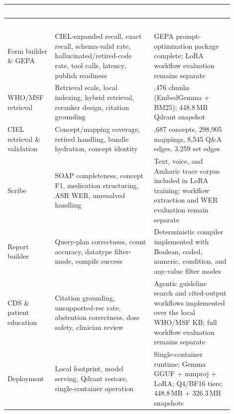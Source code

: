 \documentclass[11pt]{article}
\begin{document}
\vspace{0.4em}
{\footnotesize
\setlength{\LTleft}{0pt plus 1fill}\setlength{\LTright}{0pt plus 1fill}
\setlength{\LTpre}{0pt}\setlength{\LTpost}{0pt}
\begin{longtable}{>{\raggedright\arraybackslash}p{0.18\linewidth} >{\raggedright\arraybackslash}p{0.40\linewidth} >{\raggedright\arraybackslash}p{0.32\linewidth}}
\arrayrulecolor{panebd}\toprule
\rowcolor{brandink}\sffamily\textbf{\textcolor{white}{Workflow}} & \sffamily\textbf{\textcolor{white}{Key metrics}} & \sffamily\textbf{\textcolor{white}{Completed evidence}}\\
\midrule
\endfirsthead
\arrayrulecolor{panebd}\toprule
\rowcolor{brandink}\sffamily\textbf{\textcolor{white}{Workflow}} & \sffamily\textbf{\textcolor{white}{Key metrics}} & \sffamily\textbf{\textcolor{white}{Completed evidence}}\\
\midrule
\endhead
\bottomrule
\endlastfoot
Form builder \& GEPA & CIEL-expanded recall, exact recall, schema-valid rate, hallucinated/retired-code rate, tool calls, latency, publish readiness & GEPA prompt-optimization package complete; LoRA workflow evaluation remains separate\\
\rowcolor{rowalt}WHO/MSF retrieval & Retrieval scale, local indexing, hybrid retrieval, reranker design, citation grounding & 69,476 chunks (EmbedGemma + BM25); 448.8\,MB Qdrant snapshot\\
CIEL retrieval \& validation & Concept/mapping coverage, retired handling, bundle hydration, concept identity & 58,687 concepts, 298,905 mappings, 8,545 Q\&A edges, 3,259 set edges\\
\rowcolor{rowalt}Scribe & SOAP completeness, concept F1, medication structuring, ASR WER, unresolved handling & Text, voice, and Amharic trace corpus included in LoRA training; workflow extraction and WER evaluation remain separate\\
Report builder & Query-plan correctness, count accuracy, datatype filter-mode, compile success & Deterministic compiler implemented with Boolean, coded, numeric, condition, and any-value filter modes\\
\rowcolor{rowalt}CDS \& patient education & Citation grounding, unsupported-rec rate, abstention correctness, dose safety, clinician review & Agentic guideline search and cited-output workflows implemented over the local WHO/MSF KB; full workflow evaluation remains separate\\
Deployment & Local footprint, model serving, Qdrant restore, single-container operation & Single-container runtime; Gemma GGUF + mmproj + LoRA; Q4/BF16 tiers; 448.8\,MB + 326.3\,MB snapshots\\
\end{longtable}
}
\end{document}
